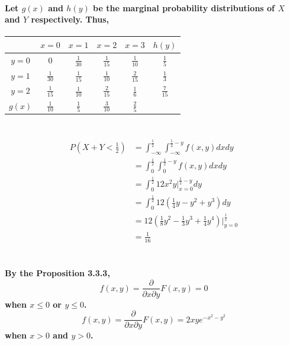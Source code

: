 \documentclass{article}
\begin{document}
            \paragraph{
                Let $g(x)$ and $h(y)$ be the marginal probability distributions of $X$ and $Y$ respectively.
                Thus,\\
            }
            \begin{tabular}{|c|c|c|c|c|c|}
                \hline        & $x=0$ & $x=1$ & $x=2$ & $x=3$ & $h(y)$\\
                \hline  $y=0$ & $0$ & $\frac{1}{30}$ & $\frac{1}{15}$ & $\frac{1}{10}$ &$\frac{1}{5}$\\
                \hline  $y=1$ & $\frac{1}{30}$ & $\frac{1}{15}$ & $\frac{1}{10}$ & $\frac{2}{15}$ & $\frac{1}{3}$ \\
                \hline  $y=2$ & $\frac{1}{15}$ & $\frac{1}{10}$ & $\frac{2}{15}$ & $\frac{1}{6}$ &$\frac{7}{15}$\\
                \hline  $g(x)$&$\frac{1}{10}$ & $\frac{1}{5}$ & $\frac{3}{10}$ &$\frac{2}{5}$ & \\
                \hline
            \end{tabular}
    \section{}
            \begin{equation}
                \begin{split}
                    P(X+Y<\frac{1}{2})
                    &=\int _{-\infty} ^{\frac{1}{2}} \int _{-\infty} ^{\frac{1}{2}-y} f(x,y) dx dy\\
                    &=\int _0 ^{\frac{1}{2}} \int _0 ^{\frac{1}{2}-y} f(x,y) dx dy\\
                    &=\int _0 ^\frac{1}{2} 12x^2y|_{x=0} ^{\frac{1}{2}-y} dy\\
                    &=\int_{0} ^\frac{1}{2} 12(\frac{1}{4}y-y^2 +y^3)dy\\
                    &=12(\frac{1}{8}y^2-\frac{1}{3}y^3+\frac{1}{4}y^4)|_{y=0} ^ \frac{1}{2}\\
                    &=\frac{1}{16}
                \end{split}
            \end{equation}
    \section{}
        \paragraph{
            By the Proposition 3.3.3,
            $$f(x,y)=\frac{\partial}{\partial x \partial y}F(x,y)=0$$
            when $x\leq 0 $ or $y\leq 0$.
            $$f(x,y)=\frac{\partial}{\partial x \partial y}F(x,y)=2xye^{-x^2-y^2}$$
            when $x>0$ and $y>0$.
        }
\end{document}
